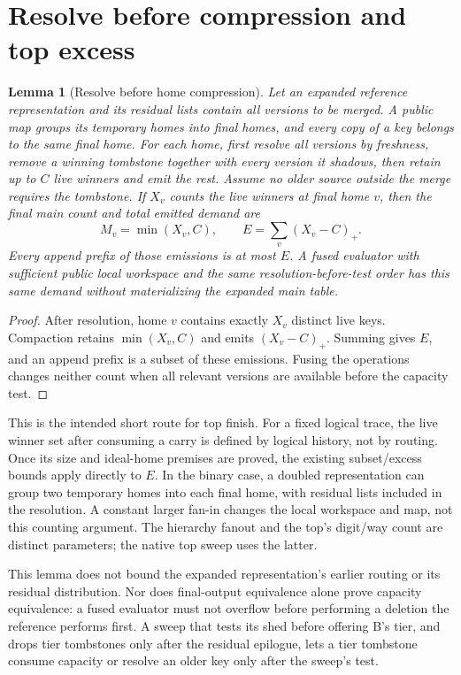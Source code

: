 \documentclass[11pt]{article}
\newtheorem{lemma}[theorem]{Lemma}
\theoremstyle{definition}
\theoremstyle{remark}
\begin{document}
\section{Resolve before compression and top excess}
\begin{lemma}[Resolve before home compression]
\label{lem:resolved-compression}
Let an expanded reference representation and its residual lists contain
all versions to be merged. A public map groups its temporary homes into
final homes, and every copy of a key belongs to the same final home.
For each home, first resolve all versions by freshness, remove a winning
tombstone together with every version it shadows, then retain up to $C$
live winners and emit the rest. Assume no older source outside the merge
requires the tombstone. If $X_v$ counts the live winners at final home $v$,
then the final main count and total emitted demand are
\[
 M_v=\min(X_v,C),\qquad E=\sum_v(X_v-C)_+.
\]
Every append prefix of those emissions is at most $E$. A fused evaluator
with sufficient public local workspace and the same resolution-before-test
order has this same demand without materializing the expanded main table.
\end{lemma}
\begin{proof}
After resolution, home $v$ contains exactly $X_v$ distinct live keys.
Compaction retains $\min(X_v,C)$ and emits $(X_v-C)_+$. Summing gives
$E$, and an append prefix is a subset of these emissions. Fusing the
operations changes neither count when all relevant versions are available
before the capacity test.
\end{proof}
This is the intended short route for top finish. For a fixed logical trace,
the live winner set after consuming a carry is defined by logical history,
not by routing. Once its size and ideal-home premises are proved, the
existing subset/excess bounds apply directly to $E$. In the binary case,
a doubled representation can group two temporary homes into each final
home, with residual lists included in the resolution. A constant larger
fan-in changes the local workspace and map, not this counting argument.
The hierarchy fanout and the top's digit/way count are distinct parameters;
the native top sweep uses the latter.

This lemma does not bound the expanded representation's earlier routing
or its residual distribution. Nor does final-output equivalence alone prove
capacity equivalence: a fused evaluator must not overflow before performing
a deletion the reference performs first. A sweep that tests its shed before
offering B's tier, and drops tier tombstones only after the residual
epilogue, lets a tier tombstone consume capacity or resolve an older key only
after the sweep's test.
\end{document}
